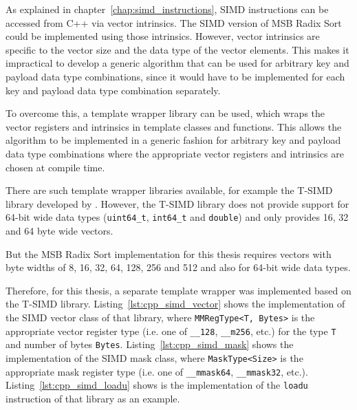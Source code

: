 \documentclass[12pt, a4paper, openright, twoside]{tiarbeit}
\begin{document}
As explained in chapter~\ref{chap:simd_instructions},
SIMD instructions can be accessed from C++ via vector intrinsics.
The SIMD version of MSB Radix Sort could be implemented using those intrinsics.
However, vector intrinsics are
specific to the vector size and the data type
of the vector elements.
This makes it impractical to develop a generic algorithm that can be used for
arbitrary key and payload data type combinations, since
it would have to be implemented for each key and payload data type combination
separately.

To overcome this, a template wrapper library can be used, which wraps
the vector registers and intrinsics in template
classes and functions. This allows the algorithm to be implemented in a generic
fashion for arbitrary key and payload data type combinations where the appropriate
vector registers and intrinsics are chosen at compile time.

There are such template wrapper libraries available, for example
the T-SIMD library developed by \citet{moeller_tsimd}.
However, the T-SIMD library does not provide support for 64-bit wide data types
(\texttt{uint64\_t}, \texttt{int64\_t} and \texttt{double}) and only provides
16, 32 and 64 byte wide vectors.

But the MSB Radix Sort implementation for this thesis requires vectors with
byte widths of 8, 16, 32, 64, 128, 256 and 512 and also for 64-bit wide data
types.



Therefore, for this thesis, a separate template wrapper was implemented based on
the T-SIMD library.
Listing~\ref{lst:cpp_simd_vector} shows the implementation
of the SIMD vector class of that library, where \texttt{MMRegType<T, Bytes>} is
the appropriate vector register type
(i.e. one of \texttt{\_\_128}, \texttt{\_\_m256}, etc.)
for the type \texttt{T} and number of bytes
\texttt{Bytes}. Listing~\ref{lst:cpp_simd_mask} shows the implementation of the SIMD mask
class, where \texttt{MaskType<Size>} is the appropriate mask register type
(i.e. one of \texttt{\_\_mmask64}, \texttt{\_\_mmask32}, etc.).
Listing~\ref{lst:cpp_simd_loadu} shows is the implementation of the \texttt{loadu} instruction
of that library as an example.
\end{document}
